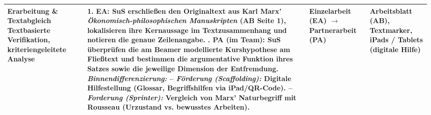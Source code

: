 \documentclass[a4paper, fontsize=9pt, landscape]{scrartcl}
\begin{document}
\begin{tabularx}{\textwidth}{|p{3.2cm}|X|p{3.0cm}|p{3.4cm}|}
\textbf{Erarbeitung \&} \newline \textbf{Textabgleich} \newline
\tiny\color{primaryBlue} Textbasierte Verifikation, \newline kriteriengeleitete \newline Analyse & 
1. \textbf{EA:} SuS erschließen den Originaltext aus Karl Marx’ \textit{Ökonomisch-philosophischen Manuskripten} (AB Seite 1), lokalisieren ihre Kernaussage im Textzusammenhang und notieren die genaue Zeilenangabe. \newline
2. \textbf{PA (im Team):} SuS überprüfen die am Beamer modellierte Kurshypothese am Fließtext und bestimmen die argumentative Funktion ihres Satzes sowie die jeweilige Dimension der Entfremdung. \newline
\textit{Binnendifferenzierung:} \newline
-- \textit{Förderung (Scaffolding):} Digitale Hilfestellung (Glossar, Begriffshilfen via iPad/QR-Code). \newline
-- \textit{Forderung (Sprinter):} Vergleich von Marx’ Naturbegriff mit Rousseau (Urzustand vs. bewusstes Arbeiten). & 
Einzelarbeit (EA) $\rightarrow$ \newline
Partnerarbeit (PA) & 
Arbeitsblatt (AB), \newline
Textmarker, \newline
iPads / Tablets \newline
(digitale Hilfe) \\
\hline


\end{tabularx}
\end{document}
